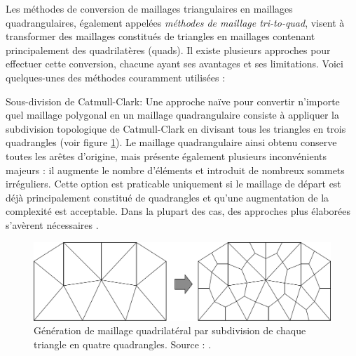 Les méthodes de conversion de maillages triangulaires en maillages quadrangulaires, également appelées \emph{méthodes de maillage tri-to-quad}, visent à transformer des maillages constitués de triangles en maillages contenant principalement des quadrilatères (quads).  Il existe plusieurs approches pour effectuer cette conversion, chacune ayant ses avantages et ses limitations. Voici quelques-unes des méthodes couramment utilisées :

Sous-division de Catmull-Clark: Une approche naïve pour convertir n'importe quel maillage polygonal en un maillage quadrangulaire consiste à appliquer la subdivision topologique de Catmull-Clark \cite{catmull1998recursively} en divisant tous les triangles en trois quadrangles (voir figure \ref{fig:tri_to_quad_1}). Le maillage quadrangulaire ainsi obtenu conserve toutes les arêtes d'origine, mais présente également plusieurs inconvénients majeurs : il augmente le nombre d'éléments et introduit de nombreux sommets irréguliers. Cette option est praticable uniquement si le maillage de départ est déjà principalement constitué de quadrangles et qu'une augmentation de la complexité est acceptable. Dans la plupart des cas, des approches plus élaborées s'avèrent nécessaires \cite{bommes2013quad}.

\begin{figure}[!h]
    \centering
    \includegraphics[scale=0.42]{images/tri_to_quad_1.png}
    \caption{Génération de maillage quadrilatéral par subdivision de chaque triangle en quatre quadrangles. Source : \cite{owen1998survey}.}
    \label{fig:tri_to_quad_1}
\end{figure}

